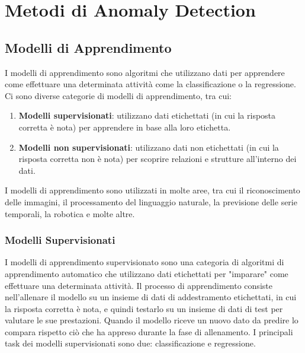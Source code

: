 \chapter{Metodi di Anomaly Detection}
\label{chap:methods}

\section{Modelli di Apprendimento}
I modelli di apprendimento sono algoritmi che utilizzano dati per apprendere come effettuare una determinata attività come la classificazione o la regressione. Ci sono diverse categorie di modelli di apprendimento, tra cui:
\begin{enumerate}
\item \textbf{Modelli supervisionati}: utilizzano dati etichettati (in cui la risposta corretta è nota) per apprendere in base alla loro etichetta.
\item \textbf{Modelli non supervisionati}: utilizzano dati non etichettati (in cui la risposta corretta non è nota) per scoprire relazioni e strutture all'interno dei dati.
\end{enumerate}

I modelli di apprendimento sono utilizzati in molte aree, tra cui il riconoscimento delle immagini, il processamento del linguaggio naturale, la previsione delle serie temporali, la robotica e molte altre.

\subsection{Modelli Supervisionati}
I modelli di apprendimento supervisionato sono una categoria di algoritmi di apprendimento automatico che utilizzano dati etichettati per "imparare" come effettuare una determinata attività. Il processo di apprendimento consiste nell'allenare il modello su un insieme di dati di addestramento etichettati, in cui la risposta corretta è nota, e quindi testarlo su un insieme di dati di test per valutare le sue prestazioni. Quando il modello riceve un nuovo dato da predire lo compara rispetto ciò che ha appreso durante la fase di allenamento. I principali task dei modelli supervisionati sono due: classificazione e regressione.

